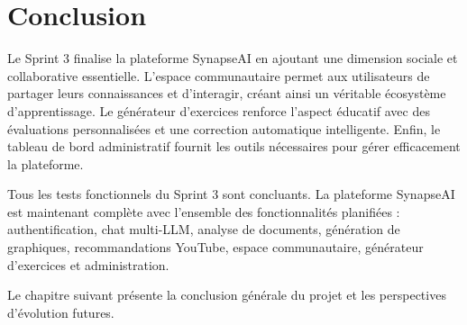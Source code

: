 \section{Conclusion}

Le Sprint 3 finalise la plateforme SynapseAI en ajoutant une dimension sociale et collaborative essentielle. L'espace communautaire permet aux utilisateurs de partager leurs connaissances et d'interagir, créant ainsi un véritable écosystème d'apprentissage. Le générateur d'exercices renforce l'aspect éducatif avec des évaluations personnalisées et une correction automatique intelligente. Enfin, le tableau de bord administratif fournit les outils nécessaires pour gérer efficacement la plateforme.

Tous les tests fonctionnels du Sprint 3 sont concluants. La plateforme SynapseAI est maintenant complète avec l'ensemble des fonctionnalités planifiées : authentification, chat multi-LLM, analyse de documents, génération de graphiques, recommandations YouTube, espace communautaire, générateur d'exercices et administration.

Le chapitre suivant présente la conclusion générale du projet et les perspectives d'évolution futures.

